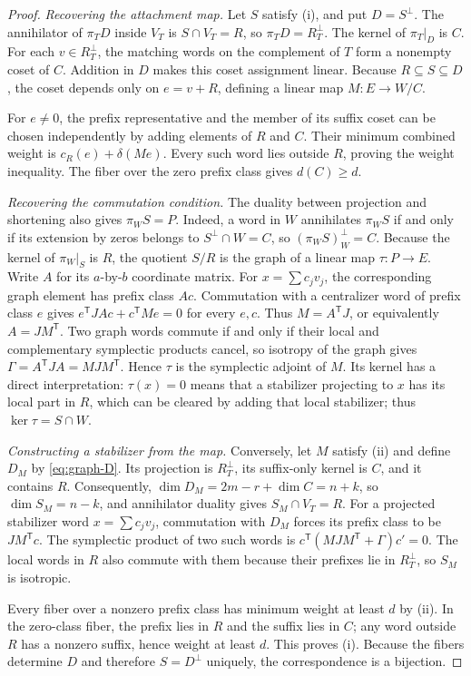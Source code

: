 \documentclass[11pt]{article}
\theoremstyle{definition}
\theoremstyle{remark}
\newcommand{\cost}{c_R}
\newcommand{\tr}{\mathsf T}
\begin{document}
\begin{proof}
\emph{Recovering the attachment map.}
Let \(S\) satisfy (i), and put \(D=S^\perp\). The annihilator of
\(\pi_TD\) inside \(V_T\) is \(S\cap V_T=R\), so \(\pi_TD=R_T^\perp\).
The kernel of \(\pi_T|_D\) is \(C\). For each \(v\in R_T^\perp\), the
matching words on the complement of \(T\) form a nonempty coset of
\(C\). Addition in \(D\) makes this coset assignment linear. Because
\(R\subseteq S\subseteq D\), the coset depends only on \(e=v+R\),
defining a linear map \(M:E\to W/C\).

For \(e\ne0\), the prefix representative and the member of its suffix
coset can be chosen independently by adding elements of \(R\) and \(C\).
Their minimum combined weight is \(\cost(e)+\delta(Me)\). Every such
word lies outside \(R\), proving the weight inequality. The fiber over
the zero prefix class gives \(d(C)\geq d\).

\emph{Recovering the commutation condition.}
The duality between projection and shortening also gives \(\pi_WS=P\).
Indeed, a word in \(W\) annihilates \(\pi_WS\) if and only if its
extension by zeros belongs to \(S^\perp\cap W=C\), so
\((\pi_WS)^\perp_W=C\). Because the kernel of \(\pi_W|_S\) is \(R\), the
quotient \(S/R\) is the graph of a linear map \(\tau:P\to E\). Write
\(A\) for its \(a\)-by-\(b\) coordinate matrix. For \(x=\sum c_jv_j\),
the corresponding graph element has prefix class \(Ac\). Commutation
with a centralizer word of prefix class \(e\) gives
\(e^\tr JAc+c^\tr Me=0\) for every \(e,c\). Thus \(M=A^\tr J\), or
equivalently \(A=JM^\tr\). Two graph words commute if and only if their
local and complementary symplectic products cancel, so isotropy of the
graph gives \(\Gamma=A^\tr JA=MJM^\tr\). Hence \(\tau\) is the
symplectic adjoint of \(M\). Its kernel has a direct interpretation:
\(\tau(x)=0\) means that a stabilizer projecting to \(x\) has its local
part in \(R\), which can be cleared by adding that local stabilizer;
thus \(\ker\tau=S\cap W\).

\emph{Constructing a stabilizer from the map.}
Conversely, let \(M\) satisfy (ii) and define \(D_M\) by
\eqref{eq:graph-D}. Its projection is
\(R_T^\perp\), its suffix-only kernel is \(C\), and it contains \(R\).
Consequently, \(\dim D_M=2m-r+\dim C=n+k\), so \(\dim S_M=n-k\), and
annihilator duality gives \(S_M\cap V_T=R\). For a projected stabilizer
word \(x=\sum c_jv_j\), commutation with \(D_M\) forces its prefix class
to be \(JM^\tr c\). The symplectic product of two such words is
\(c^\tr(MJM^\tr+\Gamma)c'=0\). The local words in \(R\) also commute
with them because their prefixes lie in \(R_T^\perp\), so \(S_M\) is
isotropic.

Every fiber over a nonzero prefix class has minimum weight at least
\(d\) by (ii). In the zero-class fiber, the prefix lies in \(R\) and the
suffix lies in \(C\); any word outside \(R\) has a nonzero suffix, hence
weight at least \(d\). This proves (i). Because the fibers determine
\(D\) and therefore \(S=D^\perp\) uniquely, the correspondence is a
bijection.
\end{proof}
\end{document}
